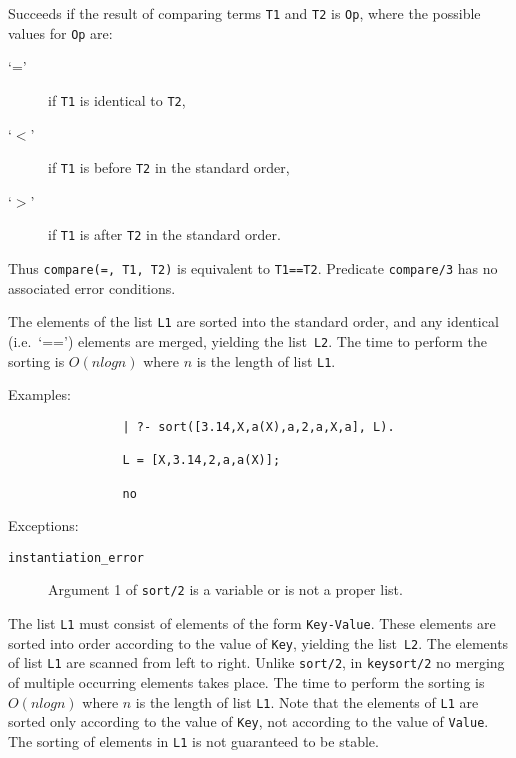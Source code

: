 \begin{description}
    Succeeds if the result of comparing terms {\tt T1} and {\tt T2} 
    is {\tt Op}, where the possible values for {\tt Op} are:
    \begin{description}
    \item[`='] if {\tt T1} is identical to {\tt T2},
    \item[`$<$'] if {\tt T1} is before {\tt T2} in the standard order,
    \item[`$>$'] if {\tt T1} is after {\tt T2} in the standard order.
    \end{description}
    Thus {\tt compare(=, T1, T2)} is equivalent to {\tt T1==T2}.
    Predicate {\tt compare/3} has no associated error conditions.

    The elements of the list {\tt L1} are sorted into the standard order,
    and any identical (i.e.\ `==') elements are merged, yielding the 
    list~{\tt L2}.  The time to perform the sorting is $O(n log n)$ where 
    $n$ is the length of list {\tt L1}.  

    Examples:
    {\footnotesize
     \begin{verbatim}
                | ?- sort([3.14,X,a(X),a,2,a,X,a], L).

                L = [X,3.14,2,a,a(X)];

                no
     \end{verbatim}}
    Exceptions:
    \begin{description}
    \item[{\tt instantiation\_error}]
	Argument 1 of {\tt sort/2} is a variable or is not a proper list.
    \end{description}


    The list {\tt L1} must consist of elements of the form \verb'Key-Value'.
    These elements are sorted into order according to the value of {\tt Key},
    yielding the list~{\tt L2}.  The elements of list {\tt L1} are scanned
    from left to right.  Unlike {\tt sort/2}, in {\tt keysort/2} no
    merging of multiple occurring elements takes place.  The time to perform
    the sorting is $O(n log n)$ where $n$ is the length of list {\tt L1}.  
    Note that the elements of {\tt L1} are sorted only according to the
    value of {\tt Key}, not according to the value of {\tt Value}.  The 
    sorting of elements in {\tt L1} is not guaranteed to be stable.


\end{description}
